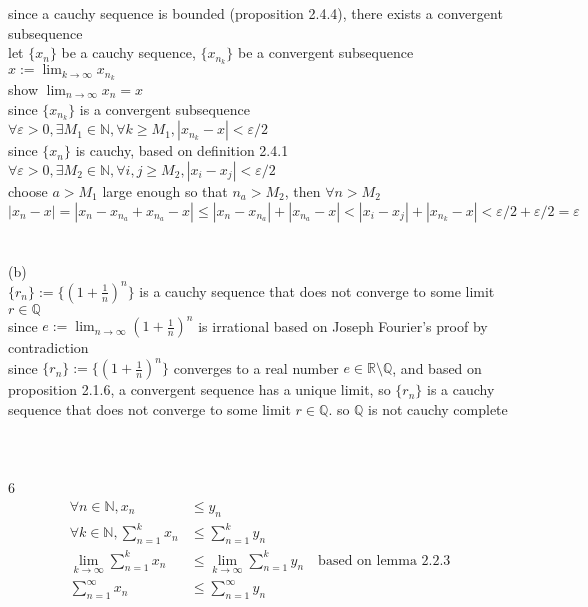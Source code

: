 \documentclass[12pt, border = 4pt, multi]{article} %
\begin{document}
since a cauchy sequence is bounded (proposition 2.4.4), there exists a convergent subsequence\\
let $\{x_n\}$ be a cauchy sequence, $\{x_{n_k}\}$ be a convergent subsequence\\ $x := \lim_{k \rightarrow \infty} x_{n_k}$\\
show $\lim_{n \rightarrow \infty} x_n = x$\\
since $\{x_{n_k}\}$ is a convergent subsequence\\
$\forall \varepsilon > 0, \exists M_1 \in \mathbb{N}, \forall k \geq M_1, |x_{n_k} - x| < \varepsilon / 2$\\
since $\{x_n\}$ is cauchy, based on definition 2.4.1\\
$\forall \varepsilon > 0, \exists M_2 \in \mathbb{N}, \forall i, j \geq M_2, |x_i - x_j| < \varepsilon / 2$\\
choose $a > M_1$ large enough so that $n_a > M_2$, then $\forall n > M_2$\\
$|x_n - x| = |x_n - x_{n_a} + x_{n_a} - x| \leq |x_n - x_{n_a}| + |x_{n_a} - x| < |x_i - x_j| + |x_{n_k} - x| < \varepsilon / 2 + \varepsilon / 2 = \varepsilon$\\
\\
\\
(b)\\
$\{r_n\} := \{(1 + \frac{1}{n}) ^ n\}$ is a cauchy sequence that does not converge to some limit $r \in \mathbb{Q}$\\
since $e := \lim_{n \rightarrow \infty} (1 + \frac{1}{n}) ^ n$ is irrational based on Joseph Fourier's proof by contradiction\\
since $\{r_n\} := \{(1 + \frac{1}{n}) ^ n\}$ converges to a  real number $e \in \mathbb{R} \setminus \mathbb{Q}$, and based on proposition 2.1.6, a convergent sequence has a unique limit, so $\{r_n\}$ is a cauchy sequence that does not converge to some limit $r \in \mathbb{Q}$. so $\mathbb{Q}$ is not cauchy complete\\
\\
\\
\\
6
\begin{align*}
\forall n \in \mathbb{N}, x_n &\leq y_n\\
\forall k \in \mathbb{N}, \sum_{n = 1} ^ k x_n &\leq \sum_{n = 1} ^ k y_n\\
\lim_{k \rightarrow \infty} \sum_{n = 1} ^ k x_n &\leq \lim_{k \rightarrow \infty} \sum_{n = 1} ^ k y_n \quad\text{based on lemma 2.2.3}\\
\sum_{n = 1} ^ {\infty} x_n &\leq \sum_{n = 1} ^ {\infty} y_n\\
\end{align*}
\end{document}
